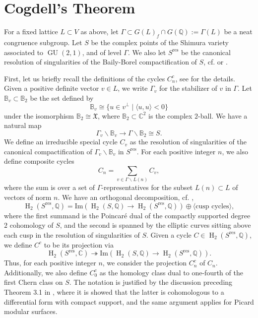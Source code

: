\documentclass[12pt,a4paper,reqno]{amsart}
\theoremstyle{definition}
\numberwithin{definition}{subsection}
\theoremstyle{definition}
\numberwithin{Definition}{subsection}
\theoremstyle{remark}
\theoremstyle{remark}
\numberwithin{Remark}{subsection}
\theoremstyle{remark}
\theoremstyle{plain}
\numberwithin{Theorem}{subsection}
\theoremstyle{plain}
\theoremstyle{plain}
\theoremstyle{plain}
\theoremstyle{plain}
\theoremstyle{plain}
\theoremstyle{plain}
\theoremstyle{plain}
\newcommand*{\Q}{\mathbb{Q}}
\newcommand*{\Cc}{\mathbb{C}}
\DeclareMathOperator{\GU}{GU}
\DeclareMathOperator{\h}{H}
\begin{document}
\section{Cogdell's Theorem}
For a fixed lattice $L\subset V$ as above, let $\Gamma\subset G(L)_f\cap G(\Q):=\Gamma(L)$ be a neat congruence subgroup. %
Let $S$ be the complex points of the Shimura variety associated to $\GU(2,1)$, and of level ${\Gamma}$. We also let $S^{\text{res}}$ be the canonical resolution of singularities of the Baily-Borel compactification of $S$, cf. \cite[\S 2]{cogdell} or \cite[p. 15]{goren}. 

First, let us briefly recall the definitions of the cycles $C_n^c$, see \cite[p. 121]{cogdell} for the details. Given a positive definite vector $v\in L$, we write $\Gamma_v$ for the stabilizer of $v$ in $\Gamma$. Let $\mathbb{B}_v\subset \mathbb{B}_2$ be the set defined by
\[
\mathbb{B}_v\cong\{u\in v^\perp\mid \langle u,u\rangle<0\}
\]
under the isomorphism $\mathbb{B}_2\cong \mathfrak{X}$, where $\mathbb{B}_2\subset \Cc^2$ is the complex $2$-ball. We have a natural map
\[
\Gamma_v\backslash \mathbb{B}_v\to \Gamma\backslash \mathbb{B}_2\cong S.
\]
We define an irreducible special cycle $C_v$ as the resolution of singularities of the canonical compactification of $\Gamma_v\backslash \mathbb{B}_v$ in $S^{\text{res}}$.
For each positive integer $n$, we also define composite cycles
\[
C_n=\sum_{v\in \Gamma\backslash L(n)} C_v,
\]
where the sum is over a set of $\Gamma$-representatives for the subset $L(n)\subset L$ of vectors of norm $n$.
We have an orthogonal decomposition, cf. \cite[p. 125]{cogdell},
\[
\h_2(S^{\text{res}}, \Q)=\text{Im}(\h_2(S,\Q)\to \h_2(S^{\text{res}}, \Q))\oplus \langle \text{cusp cycles}\rangle,
\]
where the first summand is the Poincaré dual of the compactly supported degree $2$ cohomology of $S$, and the second is spanned by the elliptic curves sitting above each cusp in the resolution of singularities of $S$. Given a cycle $C\in \h_2(S^{\text{res}}, \Q)$, we define $C^c$ to be its projection via
\[
\h_2(S^{\text{res}},\Cc)\twoheadrightarrow \text{Im}(\h_2(S,\Q)\to \h_2(S^{\text{res}}, \Q)).
\]
Thus, for each positive integer $n$, we consider the projection $C_n^c$ of $C_n$.
Additionally, we also define $C_0^c$ as the homology class dual to one-fourth of the first Chern class on $S$. The notation is justified by the discussion preceding Theorem 3.1 in \cite{hirzebruch}, where it is showed that the latter is cohomologous to a differential form with compact support, and the same argument applies for Picard modular surfaces.
\end{document}
